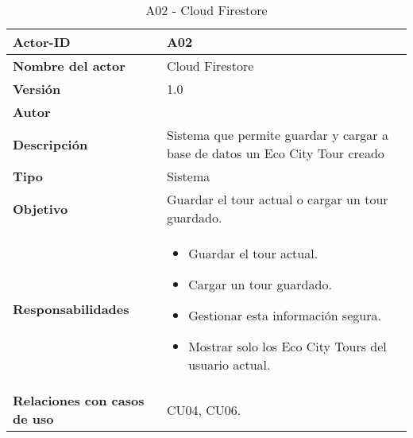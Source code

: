 \begin{table}[p]
	\centering
	\begin{tabularx}{\linewidth}{ p{} p{} }
		\toprule
		\textbf{Actor-ID}    & A02 \\
		\toprule
		\textbf{Nombre del actor} & Cloud Firestore \\
		\textbf{Versión}              & 1.0    \\
		\textbf{Autor}                & \autor \\
		\textbf{Descripción}          & Sistema que permite guardar y cargar a base de datos un Eco City Tour creado \\
		\textbf{Tipo}                 & Sistema \\
		\textbf{Objetivo}             & Guardar el tour actual o cargar un tour guardado. \\
		\textbf{Responsabilidades}    & 
		\begin{itemize}
			\tightlist
			\item Guardar el tour actual.
			\item Cargar un tour guardado.
			\item Gestionar esta información segura.
			\item Mostrar solo los Eco City Tours del usuario actual.
		\end{itemize}\\
		\textbf{Relaciones con casos de uso} & CU04, CU06. \\
		\bottomrule
	\end{tabularx}
	\caption{A02 - Cloud Firestore}
\end{table}

